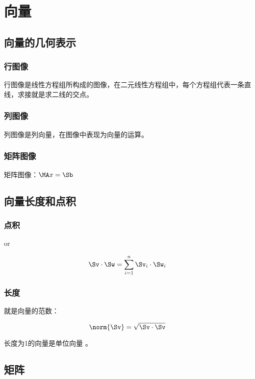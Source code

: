\chapter{向量}

\section{向量的几何表示}

\subsection{行图像}

行图像是线性方程组所构成的图像，在二元线性方程组中，每个方程组代表一条直线，求接就是求二线的交点。

\subsection{列图像}

列图像是列向量，在图像中表现为向量的运算。

\subsection{矩阵图像}

矩阵图像：$\MA x=\Sb$

\section{向量长度和点积}

\subsection{点积}

 or 

$$\Sv \cdot \Sw = \sum_{i=1}^{n}\Sv_i \cdot \Sw_i$$

\subsection{长度}

就是向量的范数：

$$\norm{\Sv} = \sqrt{\Sv \cdot \Sv}$$

长度为1的向量是单位向量 。

\section{矩阵}

